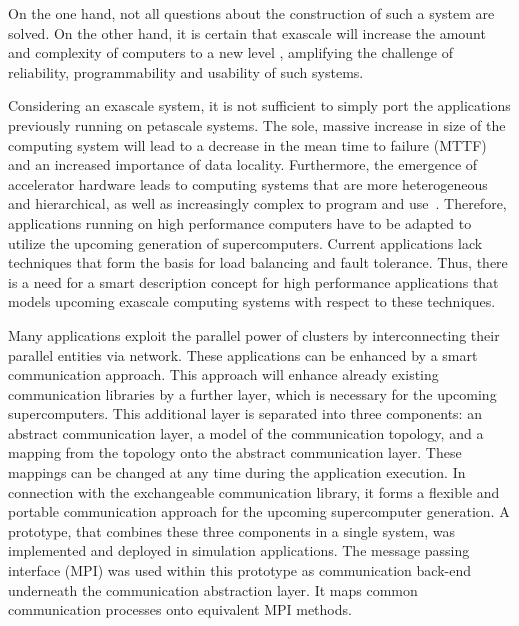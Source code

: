 On the one hand, not all questions about the construction of such a system are
solved. On the other hand, it is certain that exascale will increase the amount and
complexity of computers to a new level \cite{ref:cresta}, amplifying
the challenge of reliability, programmability and usability of such
systems.

Considering an exascale system, it is not sufficient to simply port
the applications previously running on petascale systems. The sole,
massive increase in size of the computing system will lead to a
decrease in the mean time to failure (MTTF) and an increased
importance of data locality.  Furthermore, the emergence of
accelerator  hardware leads to computing systems that are more
heterogeneous and hierarchical, as well as increasingly complex to
program and use~\cite{ref:accel}. Therefore, applications running on high performance
computers have to be adapted to utilize the upcoming generation of
supercomputers.  Current applications lack techniques that form the
basis for load balancing and fault tolerance.  Thus, there is a need
for a smart description concept for high performance applications that
models upcoming exascale computing systems with respect to these
techniques.

Many applications exploit the parallel power of clusters by
interconnecting their parallel entities via network. These
applications can be enhanced by a smart communication approach. This
approach will enhance already existing communication libraries by a
further layer, which is necessary for the upcoming
supercomputers. This additional layer is separated into three
components: an abstract communication layer, a model of the
communication topology, and a mapping from the topology onto the
abstract communication layer.  These mappings can be changed at any
time during the application execution. In connection with the
exchangeable communication library, it forms a flexible and portable
communication approach for the upcoming supercomputer generation.  A
prototype, that combines these three components in a single system,
was implemented and deployed in simulation applications. The message
passing interface (MPI) was used within this prototype as
communication back-end underneath the communication abstraction
layer. It maps common communication processes onto equivalent MPI
methods.


